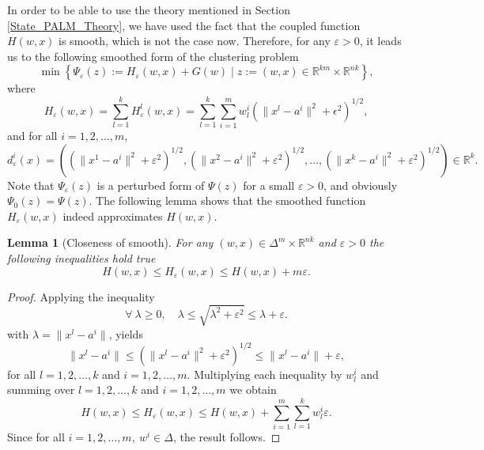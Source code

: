 \documentclass[11pt]{article}
\numberwithin{equation}{section}
\newtheorem{lemma}{Lemma}[proposition]
\begin{document}
In order to be able to use the theory mentioned in Section \ref{State_PALM_Theory}, we have used the fact that the coupled function $H(w,x)$ is smooth, which is not the case now. Therefore, for any $\varepsilon > 0$, it leads us to the following smoothed form of the clustering problem
\begin{equation}
	\min \left\lbrace \Psi_{\varepsilon}(z) := H_{\varepsilon}(w,x) + G(w) \mid z := (w,x) \in \mathbb{R}^{km} \times \mathbb{R}^{nk} \right\rbrace , \label{StateEq31}
\end{equation}
where 
\begin{equation}
	H_{\varepsilon}(w,x) = \sum\limits_{l=1}^{k} H^l_{\varepsilon}(w,x)
	= \sum\limits_{l=1}^{k} \sum\limits_{i=1}^{m} w^i_l \left( \| x^l - a^i \|^2 + {\epsilon}^2 \right)^{1/2} , \label{StateEq34}
\end{equation}
and for all $i=1,2, \ldots, m$,
\begin{equation}
	d_{\varepsilon}^i(x) = \left( \left( \|x^1 - a^i\|^2 + {\varepsilon}^2 \right)^{1/2}, \left( \|x^2 - a^i\|^2 + {\varepsilon}^2 \right)^{1/2}, \ldots , \left( \|x^k - a^i\|^2 + {\varepsilon}^2 \right)^{1/2} \right) \in \mathbb{R}^k . \label{StateEq35}
\end{equation}
Note that $\Psi_{\varepsilon}(z)$ is a perturbed form of $\Psi(z)$ for a small $\varepsilon > 0$, and obviously $\Psi_0(z)=\Psi(z)$. The following lemma shows that the smoothed function $H_{\varepsilon}(w,x)$ indeed approximates $H(w,x)$.

\begin{lemma}[Closeness of smooth]
For any $(w,x) \in {\Delta}^m \times \mathbb{R}^{nk}$ and $\varepsilon > 0$ the following inequalities hold true
\begin{equation*}
	H(w,x) \leq H_{\varepsilon}(w,x) \leq H(w,x) + m\varepsilon .
\end{equation*}
\end{lemma}

\begin{proof}
Applying the inequality
\begin{equation*}
	\forall \: \lambda \geq 0, \quad \lambda \leq \sqrt{\lambda^2 + \varepsilon^2} \leq \lambda + \varepsilon .
\end{equation*}
with $\lambda = \|x^l - a^i \|$, yields
\begin{equation*}
	\|x^l - a^i \| \leq \left(\|x^l - a^i \|^2 + {\varepsilon}^2 \right)^{1/2} \leq \|x^l - a^i \| + \varepsilon ,
\end{equation*}
for all $l=1,2, \ldots, k$ and $i=1,2, \ldots, m$.
Multiplying each inequality by $w^i_l$ and summing over $l=1,2, \ldots, k$ and $i=1,2, \ldots, m$ we obtain
\begin{equation*}
	H(w,x) \leq H_{\varepsilon}(w,x) \leq H(w,x) + \sum\limits_{i=1}^m \sum\limits_{l=1}^k w^i_l \varepsilon .
\end{equation*}
Since for all $i=1,2, \dots, m, \: w^i \in \Delta$, the result follows.
\end{proof}
\end{document}
